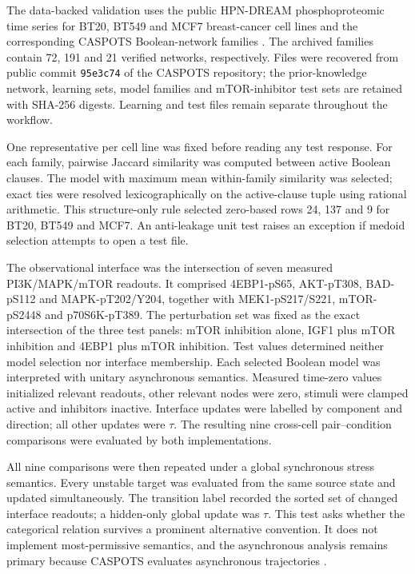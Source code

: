 \documentclass[JMCS,submit]{resources/ISRP}
\theoremstyle{definition}
\theoremstyle{remark}
\numberwithin{equation}{section}
\newcommand{\TAU}{\tau}
\begin{document}
The data-backed validation uses the public HPN-DREAM phosphoproteomic time series
for BT20, BT549 and MCF7 breast-cancer cell lines \cite{Hill2016} and the
corresponding CASPOTS Boolean-network families \cite{Razzaq2018}. The archived
families contain 72, 191 and 21 verified
networks, respectively. Files were recovered from public commit
\texttt{95e3c74} of the CASPOTS repository; the prior-knowledge network, learning
sets, model families and mTOR-inhibitor test sets are retained with SHA-256
digests. Learning and test files remain separate throughout the workflow.

One representative per cell line was fixed before reading any test response.
For each family, pairwise Jaccard similarity was computed between active Boolean
clauses. The model with maximum mean within-family similarity was selected; exact
ties were resolved lexicographically on the active-clause tuple using rational
arithmetic. This structure-only rule selected zero-based rows 24, 137 and 9 for
BT20, BT549 and MCF7. An anti-leakage unit test raises an exception if medoid
selection attempts to open a test file.

The observational interface was the intersection of seven measured
PI3K/MAPK/mTOR readouts. It comprised 4EBP1-\allowbreak{}pS65,
AKT-\allowbreak{}pT308, BAD-\allowbreak{}pS112 and
MAPK-\allowbreak{}pT202/\allowbreak{}Y204, together with
MEK1-\allowbreak{}pS217/\allowbreak{}S221, mTOR-\allowbreak{}pS2448 and
p70S6K-\allowbreak{}pT389.
The perturbation set was fixed as
the exact intersection of the three test panels: mTOR inhibition alone,
IGF1 plus mTOR inhibition and 4EBP1 plus mTOR inhibition. Test values determined
neither model selection nor interface membership. Each selected Boolean model
was interpreted with unitary asynchronous semantics. Measured time-zero values
initialized relevant readouts, other relevant nodes were zero, stimuli were
clamped active and inhibitors inactive. Interface updates were labelled by
component and direction; all other updates were $\TAU$. The resulting nine
cross-cell pair--condition comparisons were evaluated by both implementations.

All nine comparisons were then repeated under a global synchronous stress
semantics. Every unstable target was evaluated from the same source state and
updated simultaneously. The transition label recorded the sorted set of changed
interface readouts; a hidden-only global update was $\TAU$. This test asks whether
the categorical relation survives a prominent alternative convention. It does
not implement most-permissive semantics, and the asynchronous analysis remains
primary because CASPOTS evaluates asynchronous trajectories \cite{Pauleve2020,
Razzaq2018}.
\end{document}
